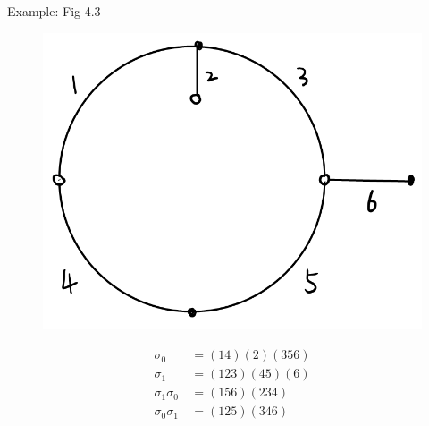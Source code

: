 \documentclass[pdf]{beamer}
\numberwithin{equation}{section}
\theoremstyle{plain}
\theoremstyle{plain}
\theoremstyle{remark}
\newtheorem{remark}[theorem]{Remark}
\begin{document}
\begin{frame}[fragile]{Example: Fig 4.3}
\begin{figure}[th]
	\begin{minipage}[t]{.3\textwidth}
		\centering
		\vspace{0cm}
		\includegraphics[width=\textwidth]{figures/permrep2.png}
	\end{minipage}
	
	\begin{minipage}[t]{.4\textwidth}
		\begin{equation*}
		\begin{aligned}
		\sigma_0 & \, = (14)(2)(356) \\
		\sigma_1 & \, = (123)(45)(6) \\
		\sigma_1\sigma_0 & \, = (156)(234)\\
		\sigma_0\sigma_1 & \, = (125)(346)
		\end{aligned}
		\end{equation*}
	\end{minipage}
\end{figure}
\end{frame}
\end{document}
